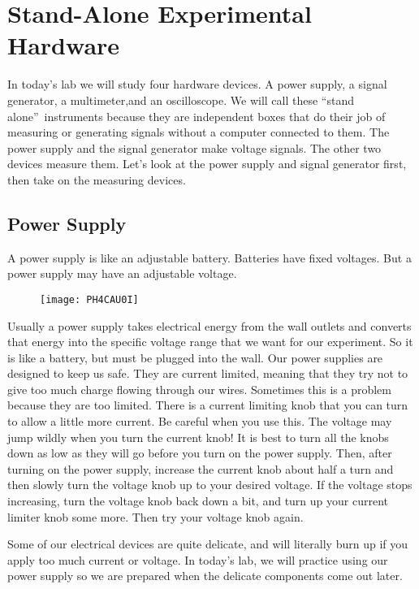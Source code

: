 \section{Stand-Alone Experimental Hardware}

In today's lab we will study four hardware devices. A power supply, a signal
generator, a multimeter,and an oscilloscope. We will call these
\textquotedblleft stand alone\textquotedblright\ instruments because they
are independent boxes that do their job of measuring or generating signals
without a computer connected to them. The power supply and the signal
generator make voltage signals. The other two devices measure them. Let's
look at the power supply and signal generator first, then take on the
measuring devices.

\subsection{Power Supply}

A power supply is like an adjustable battery. Batteries have fixed voltages.
But a power supply may have an adjustable voltage. \begin{figure}[h!]
\texttt{[image: PH4CAU0I]}
\end{figure}Usually a power supply takes
electrical energy from the wall outlets and converts that energy into the
specific voltage range that we want for our experiment. So it is like a
battery, but must be plugged into the wall. Our power supplies are designed
to keep us safe. They are current limited, meaning that they try not to give
too much charge flowing through our wires. Sometimes this is a problem
because they are too limited. There is a current limiting knob that you can
turn to allow a little more current. Be careful when you use this. The
voltage may jump wildly when you turn the current knob! It is best to turn
all the knobs down as low as they will go before you turn on the power
supply. Then, after turning on the power supply, increase the current knob
about half a turn and then slowly turn the voltage knob up to your desired
voltage. If the voltage stops increasing, turn the voltage knob back down a
bit, and turn up your current limiter knob some more. Then try your voltage
knob again.

Some of our electrical devices are quite delicate, and will literally burn
up if you apply too much current or voltage. In today's lab, we will
practice using our power supply so we are prepared when the delicate
components come out later.

